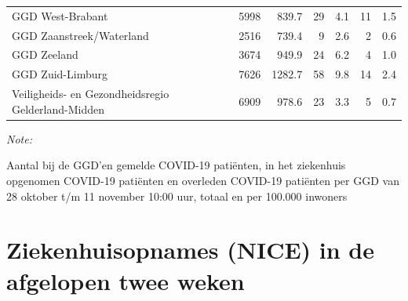 \documentclass[
  english,
  man,floatsintext]{apa6}
\begin{document}
\begin{table}
\begin{threeparttable}
\begin{tabular}{lrrrrrr}
GGD West-Brabant & 5998 & 839.7 & 29 & 4.1 & 11 & 1.5\\
GGD Zaanstreek/Waterland & 2516 & 739.4 & 9 & 2.6 & 2 & 0.6\\
GGD Zeeland & 3674 & 949.9 & 24 & 6.2 & 4 & 1.0\\
GGD Zuid-Limburg & 7626 & 1282.7 & 58 & 9.8 & 14 & 2.4\\
Veiligheids- en Gezondheidsregio Gelderland-Midden & 6909 & 978.6 & 23 & 3.3 & 5 & 0.7\\
\bottomrule
\end{tabular}
\begin{tablenotes}
\item \textit{Note: } 
\item Aantal bij de GGD’en gemelde COVID-19 patiënten, in het ziekenhuis opgenomen COVID-19 patiënten en overleden COVID-19 patiënten per GGD van 28 oktober t/m 11 november 10:00 uur, totaal en per 100.000 inwoners
\end{tablenotes}
\end{threeparttable}
\endgroup{}
\end{table}

\newpage

\hypertarget{ziekenhuisopnames-nice-in-de-afgelopen-twee-weken}{%
\section{Ziekenhuisopnames (NICE) in de afgelopen twee weken}\label{ziekenhuisopnames-nice-in-de-afgelopen-twee-weken}}
\end{document}
